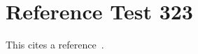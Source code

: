 \documentclass{article}
\begin{document}
\section{Reference Test 323}
This cites a reference~\cite{test323}.

\end{document}
